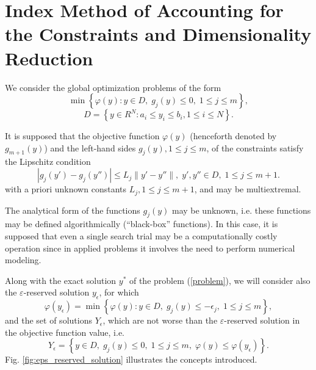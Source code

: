 \documentclass[preprint]{elsarticle}
\begin{document}
\section{Index Method of Accounting for the Constraints and Dimensionality Reduction}
	We consider the global optimization problems of the form
\begin{equation}\label{problem}
	\min{\left\{\varphi(y):y \in D, \; g_j(y)\leq 0, \; 1 \leq j \leq m\right\}},
\end{equation}
\begin{equation}\label{D}
	D=\left\{y\in R^N: a_i\leq y_i \leq b_i, 1\leq i \leq N\right\}.
\end{equation}

	It is supposed that the objective function $\varphi(y)$ (henceforth denoted by $g_{m+1}(y)$) and the left-hand sides $g_{j}(y), 1 \leq j \leq m$, of the constraints satisfy the Lipschitz condition
\begin{equation}\label{lipschitz_condition}
	\left|g_j(y')-g_j (y'')\right| \leq L_j \|y'-y''\|, \; y', y''\in D, \; 1\leq j \leq m+1.
\end{equation}
with a priori unknown constants $L_j, 1\leq j \leq m+1$, and may be multiextremal.

	The analytical form of the functions $g_{j}(y)$ may be unknown, i.e. these functions may be defined algorithmically (“black-box” functions). In this case, it is supposed that even a single search trial may be a computationally costly operation since in applied problems it involves the need to perform numerical modeling. 
	
	Along with the exact solution $y^\ast$ of the problem (\ref{problem}), we will consider also the $\varepsilon$-reserved solution $y_{\epsilon}$, for which 
\begin{equation}\label{epsilon_reserved_solution}
	\varphi(y_{\epsilon})=\min{\left\{\varphi(y):y \in D, \; g_j(y)\leq -{\epsilon}_j, \; 1 \leq j \leq m\right\}},
\end{equation}
and the set of solutions $Y_{\epsilon}$, which are not worse than the $\varepsilon$-reserved solution in the objective function value, i.e.
\begin{equation}\label{Y_epsilon}
	Y_{\epsilon}=\left\{ y \in D, \; g_j(y) \leq 0, \; 1 \leq j \leq m, \; \varphi(y) \leq \varphi(y_{\epsilon}) \right\}.
\end{equation}
Fig. \ref{fig:eps_reserved_solution} illustrates the concepts introduced.
\end{document}
